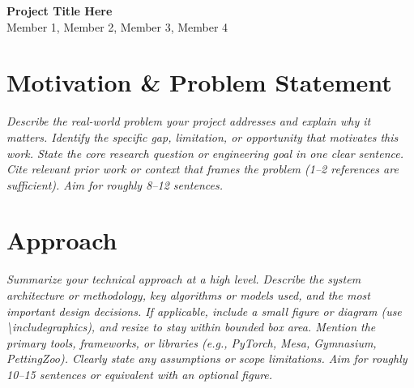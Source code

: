 \documentclass[11pt, letterpaper]{article}
\newcommand{\placeholder}[1]{\textcolor{placeholder}{\textit{#1}}}
\begin{document}
\begin{center}
  {\Large\bfseries\color{headcolor} Project Title Here}\\[4pt]
  {\normalsize Member 1, Member 2, Member 3, Member 4}\\[2pt]
\end{center}

\vspace{4pt}

\section{Motivation \& Problem Statement}
\begin{tcolorbox}[sectionbox, height=4.6cm, valign=top]
  \placeholder{%
    Describe the real-world problem your project addresses and explain
    why it matters. Identify the specific gap, limitation, or
    opportunity that motivates this work. State the core research
    question or engineering goal in one clear sentence.
    Cite relevant prior work or context that frames the problem
    (1--2 references are sufficient). Aim for roughly 8--12 sentences.}
\end{tcolorbox}

\section{Approach}
\begin{tcolorbox}[sectionbox, height=7.0cm, valign=top]
  \placeholder{%
    Summarize your technical approach at a high level. Describe the
    system architecture or methodology, key algorithms or models used,
    and the most important design decisions. If applicable, include a
    small figure or diagram (use \textbackslash includegraphics), and resize to stay within bounded box area.
    Mention the primary tools, frameworks, or libraries
    (e.g., PyTorch, Mesa, Gymnasium, PettingZoo).
    Clearly state any assumptions or scope limitations.
    Aim for roughly 10--15 sentences or equivalent with an optional figure.}
\end{tcolorbox}

\end{document}
